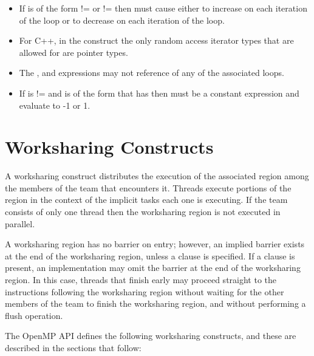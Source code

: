 \begin{ccppspecific}
\begin{itemize}
    \item If  is of the form  !=  or
     !=  then  must cause 
    either to increase on each iteration of the loop or to decrease on
    each iteration of the loop.

    \item For C++, in the  construct the only random access iterator types that are 
    allowed for  are pointer types.
    
    \item The ,  and  expressions may not reference
     of any of the associated loops.

    \item If  is != and  is of the
    form that has  then  must be a constant expression and
    evaluate to -1 or 1.
\end{itemize}
\end{ccppspecific}





\section{Worksharing Constructs}
\label{sec:Worksharing Constructs}
A worksharing construct distributes the execution of the associated region among the 
members of the team that encounters it. Threads execute portions of the region in the 
context of the implicit tasks each one is executing. If the team consists of only one 
thread then the worksharing region is not executed in parallel.

A worksharing region has no barrier on entry; however, an implied barrier exists at the 
end of the worksharing region, unless a  clause is specified. If a  
clause is present, an implementation may omit the barrier at the end of the worksharing 
region. In this case, threads that finish early may proceed straight to the instructions 
following the worksharing region without waiting for the other members of the team to 
finish the worksharing region, and without performing a flush operation. 

The OpenMP API defines the following worksharing constructs, and these are described 
in the sections that follow:

